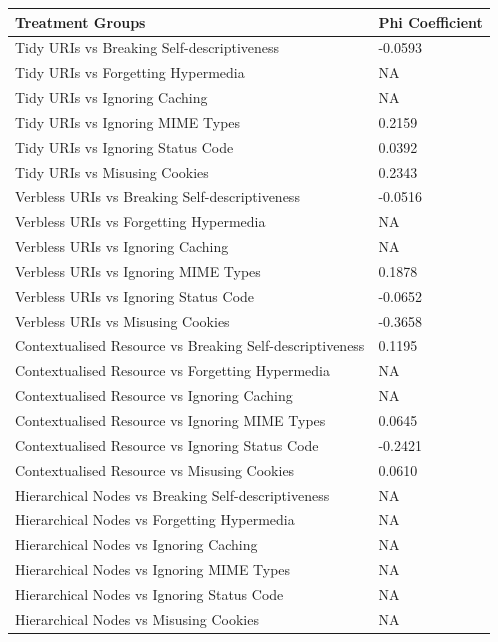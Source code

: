 \begin{table}[ht!]
    \centering
    \small
 \begin{tabular}{|l|l|}
\hline \textbf{Treatment Groups} & \textbf{Phi Coefficient} 
\\ \hline 
Tidy URIs vs Breaking Self-descriptiveness & -0.0593
\\ \hline 
Tidy URIs vs Forgetting Hypermedia & NA
\\ \hline 
Tidy URIs vs Ignoring Caching & NA
\\ \hline 
Tidy URIs vs Ignoring MIME Types & 0.2159
\\ \hline 
Tidy URIs vs Ignoring Status Code & 0.0392
\\ \hline 
Tidy URIs vs Misusing Cookies & 0.2343
\\ \hline 
Verbless URIs vs Breaking Self-descriptiveness & -0.0516
\\ \hline 
Verbless URIs vs Forgetting Hypermedia & NA
\\ \hline 
Verbless URIs vs Ignoring Caching & NA
\\ \hline 
Verbless URIs vs Ignoring MIME Types & 0.1878
\\ \hline 
Verbless URIs vs Ignoring Status Code & -0.0652
\\ \hline 
Verbless URIs vs Misusing Cookies & -0.3658
\\ \hline 
Contextualised Resource vs Breaking Self-descriptiveness & 0.1195
\\ \hline 
Contextualised Resource vs Forgetting Hypermedia & NA
\\ \hline 
Contextualised Resource vs Ignoring Caching & NA
\\ \hline 
Contextualised Resource vs Ignoring MIME Types & 0.0645
\\ \hline 
Contextualised Resource vs Ignoring Status Code & -0.2421
\\ \hline 
Contextualised Resource vs Misusing Cookies & 0.0610
\\ \hline 
Hierarchical Nodes vs Breaking Self-descriptiveness & NA
\\ \hline 
Hierarchical Nodes vs Forgetting Hypermedia & NA
\\ \hline 
Hierarchical Nodes vs Ignoring Caching & NA
\\ \hline 
Hierarchical Nodes vs Ignoring MIME Types & NA
\\ \hline 
Hierarchical Nodes vs Ignoring Status Code & NA
\\ \hline 
Hierarchical Nodes vs Misusing Cookies & NA
\\ \hline 

\end{tabular}
\end{table}

